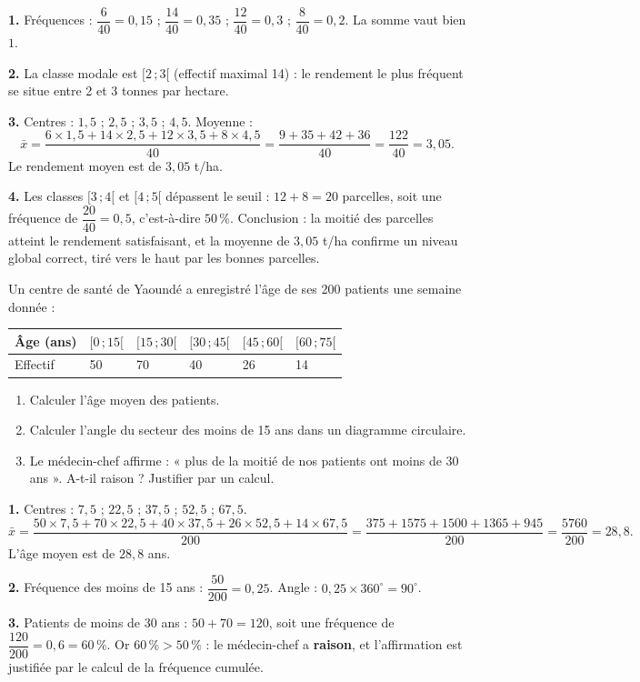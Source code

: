 \documentclass[11pt]{article}
\begin{document}
\begin{corrige}
\textbf{1.} Fréquences : $\dfrac{6}{40}=0{,}15$ ; $\dfrac{14}{40}=0{,}35$ ; $\dfrac{12}{40}=0{,}3$ ; $\dfrac{8}{40}=0{,}2$. La somme vaut bien $1$.

\textbf{2.} La classe modale est $[2\,;3[$ (effectif maximal 14) : le rendement le plus fréquent se situe entre 2 et 3 tonnes par hectare.

\textbf{3.} Centres : $1{,}5$ ; $2{,}5$ ; $3{,}5$ ; $4{,}5$. Moyenne :
\[
\bar{x}=\frac{6\times 1{,}5+14\times 2{,}5+12\times 3{,}5+8\times 4{,}5}{40}=\frac{9+35+42+36}{40}=\frac{122}{40}=3{,}05.
\]
Le rendement moyen est de $3{,}05$ t/ha.

\textbf{4.} Les classes $[3\,;4[$ et $[4\,;5[$ dépassent le seuil : $12+8=20$ parcelles, soit une fréquence de $\dfrac{20}{40}=0{,}5$, c'est-à-dire $50\,\%$. Conclusion : la moitié des parcelles atteint le rendement satisfaisant, et la moyenne de $3{,}05$ t/ha confirme un niveau global correct, tiré vers le haut par les bonnes parcelles.
\end{corrige}

\begin{exercice}
Un centre de santé de Yaoundé a enregistré l'âge de ses 200 patients une semaine donnée :
\begin{center}
\begin{tabularx}{\linewidth}{|l|X|X|X|X|X|}
\hline
\rowcolor{poppinkL} Âge (ans) & $[0\,;15[$ & $[15\,;30[$ & $[30\,;45[$ & $[45\,;60[$ & $[60\,;75[$ \\
\hline
Effectif & 50 & 70 & 40 & 26 & 14 \\
\hline
\end{tabularx}
\end{center}
\begin{enumerate}
\item Calculer l'âge moyen des patients.
\item Calculer l'angle du secteur des moins de 15 ans dans un diagramme circulaire.
\item Le médecin-chef affirme : « plus de la moitié de nos patients ont moins de 30 ans ». A-t-il raison ? Justifier par un calcul.
\end{enumerate}
\end{exercice}

\begin{corrige}
\textbf{1.} Centres : $7{,}5$ ; $22{,}5$ ; $37{,}5$ ; $52{,}5$ ; $67{,}5$.
\[
\bar{x}=\frac{50\times 7{,}5+70\times 22{,}5+40\times 37{,}5+26\times 52{,}5+14\times 67{,}5}{200}=\frac{375+1575+1500+1365+945}{200}=\frac{5760}{200}=28{,}8.
\]
L'âge moyen est de $28{,}8$ ans.

\textbf{2.} Fréquence des moins de 15 ans : $\dfrac{50}{200}=0{,}25$. Angle : $0{,}25 \times 360^\circ = 90^\circ$.

\textbf{3.} Patients de moins de 30 ans : $50+70=120$, soit une fréquence de $\dfrac{120}{200}=0{,}6=60\,\%$. Or $60\,\% > 50\,\%$ : le médecin-chef a \textbf{raison}, et l'affirmation est justifiée par le calcul de la fréquence cumulée.
\end{corrige}
\end{document}
